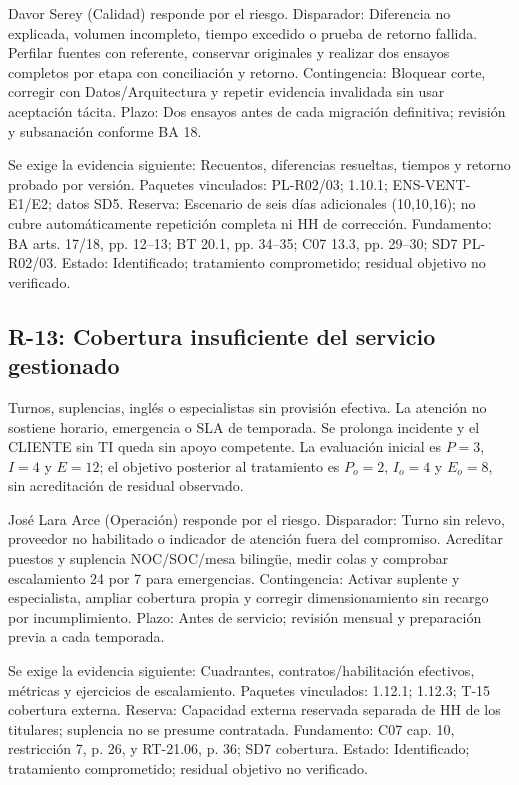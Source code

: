 Davor Serey (Calidad) responde por el riesgo. Disparador: Diferencia no explicada, volumen incompleto, tiempo excedido o prueba de retorno fallida. Perfilar fuentes con referente, conservar originales y realizar dos ensayos completos por etapa con conciliación y retorno. Contingencia: Bloquear corte, corregir con Datos/Arquitectura y repetir evidencia invalidada sin usar aceptación tácita. Plazo: Dos ensayos antes de cada migración definitiva; revisión y subsanación conforme BA 18.

Se exige la evidencia siguiente: Recuentos, diferencias resueltas, tiempos y retorno probado por versión. Paquetes vinculados: PL-R02/03; 1.10.1; ENS-VENT-E1/E2; datos SD5. Reserva: Escenario de seis días adicionales (10,10,16); no cubre automáticamente repetición completa ni HH de corrección. Fundamento: BA arts. 17/18, pp. 12–13; BT 20.1, pp. 34–35; C07 13.3, pp. 29–30; SD7 PL-R02/03. Estado: Identificado; tratamiento comprometido; residual objetivo no verificado. \parencites[arts.~17/18, pp.~12--13]{sd8-ba}[sección 20.1, pp.~34--35]{sd8-bt}[numeral 13.3, pp.~29--30]{sd8-c07}

\subsection{R-13: Cobertura insuficiente del servicio gestionado}
Turnos, suplencias, inglés o especialistas sin provisión efectiva. La atención no sostiene horario, emergencia o SLA de temporada. Se prolonga incidente y el CLIENTE sin TI queda sin apoyo competente. La evaluación inicial es $P=3$, $I=4$ y $E=12$; el objetivo posterior al tratamiento es $P_o=2$, $I_o=4$ y $E_o=8$, sin acreditación de residual observado.

José Lara Arce (Operación) responde por el riesgo. Disparador: Turno sin relevo, proveedor no habilitado o indicador de atención fuera del compromiso. Acreditar puestos y suplencia NOC/SOC/mesa bilingüe, medir colas y comprobar escalamiento 24 por 7 para emergencias. Contingencia: Activar suplente y especialista, ampliar cobertura propia y corregir dimensionamiento sin recargo por incumplimiento. Plazo: Antes de servicio; revisión mensual y preparación previa a cada temporada.

Se exige la evidencia siguiente: Cuadrantes, contratos/habilitación efectivos, métricas y ejercicios de escalamiento. Paquetes vinculados: 1.12.1; 1.12.3; T-15 cobertura externa. Reserva: Capacidad externa reservada separada de HH de los titulares; suplencia no se presume contratada. Fundamento: C07 cap. 10, restricción 7, p. 26, y RT-21.06, p. 36; SD7 cobertura. Estado: Identificado; tratamiento comprometido; residual objetivo no verificado. \parencite[cap.~10, restricción 7, p.~26; RT-21.06, p.~36]{sd8-c07}

